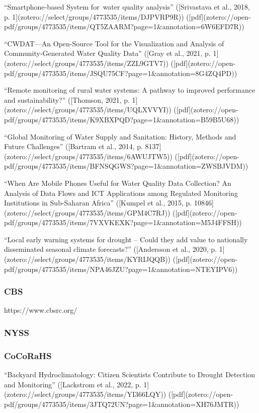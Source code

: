 {“Smartphone‑based System for water quality analysis” ([Srivastava et al., 2018, p. 1](zotero://select/groups/4773535/items/DJPVRP9R)) ([pdf](zotero://open-pdf/groups/4773535/items/QT5ZAARM?page=1&annotation=6W6EFD7R))

“CWDAT—An Open-Source Tool for the Visualization and Analysis of Community-Generated Water Quality Data” ([Gray et al., 2021, p. 1](zotero://select/groups/4773535/items/ZZL9GTV7)) ([pdf](zotero://open-pdf/groups/4773535/items/JSQU75CF?page=1&annotation=8G4ZQ4PD))

“Remote monitoring of rural water systems: A pathway to improved performance and sustainability?” ([Thomson, 2021, p. 1](zotero://select/groups/4773535/items/UQLXVVYI)) ([pdf](zotero://open-pdf/groups/4773535/items/K9XBXPQD?page=1&annotation=B59B5U68))

“Global Monitoring of Water Supply and Sanitation: History, Methods and Future Challenges” ([Bartram et al., 2014, p. 8137](zotero://select/groups/4773535/items/6AWUJTW5)) ([pdf](zotero://open-pdf/groups/4773535/items/BFNSQGWS?page=1&annotation=ZWSBJVDM))

“When Are Mobile Phones Useful for Water Quality Data Collection? An Analysis of Data Flows and ICT Applications among Regulated Monitoring Institutions in Sub-Saharan Africa” ([Kumpel et al., 2015, p. 10846](zotero://select/groups/4773535/items/GPM4C7RJ)) ([pdf](zotero://open-pdf/groups/4773535/items/7VXVKEXK?page=1&annotation=M5J4FFSH))

“Local early warning systems for drought – Could they add value to nationally disseminated seasonal climate forecasts?” ([Andersson et al., 2020, p. 1](zotero://select/groups/4773535/items/KYRIJQQB)) ([pdf](zotero://open-pdf/groups/4773535/items/NPA46JZU?page=1&annotation=NTEYIPV6))

\subsubsection{CBS}
https://www.cbsrc.org/

\subsubsection{NYSS}

\subsubsection{CoCoRaHS}
“Backyard Hydroclimatology: Citizen Scientists Contribute to Drought Detection and Monitoring” ([Lackstrom et al., 2022, p. 1](zotero://select/groups/4773535/items/YI366LQY)) ([pdf](zotero://open-pdf/groups/4773535/items/3JTQ72UN?page=1&annotation=XH76JMTR))

}
